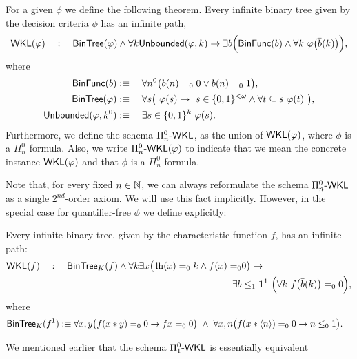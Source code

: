 \begin{dfn} \label{l:WKL-Feferman}
For a given $\phi$ we define the following theorem. 
Every infinite binary tree given by the decision criteria $\phi$
 has an infinite path,
\[
\textsf{\upshape WKL}(\varphi)\quad:\quad  \textsf{\upshape BinTree}(\varphi) \wedge \forall k \textsf{\upshape Unbounded}(\varphi,k) 
     \rightarrow \exists b\Big(\textsf{\upshape BinFunc}(b)\wedge\forall k\ \varphi\big(\bar{b}(k)\big)\Big)\text{,}
\]where
\begin{align*}
\BFunc(b)&:\equiv\quad \forall n^0\big(b(n)=_00 \vee b(n)=_01\big)\text{,}\\
\BTree(\phi)&:\equiv\quad \forall s \big(\ 
   \phi(s) 
      \rightarrow
 \ s\in\{0,1\}^{<\omega}
   \wedge 
   \forall t\subseteq s\ \phi(t)\ \big)\text{,}\\
\UnBounded(\phi,k^0)&:\equiv\quad 
  \exists s\in\{0,1\}^{k}\ \phi(s)\text{.}
\end{align*}
Furthermore, we define the schema $\Pi_n^0\textsf{\upshape -}\textsf{\upshape WKL}$, as the union of $\textsf{\upshape WKL}(\varphi)$, where
$\phi$ is a $\Pi_n^0$ formula. Also, we write $\Pi_n^0\textsf{\upshape -}\textsf{\upshape WKL}(\varphi)$ to indicate
that we mean the concrete instance $\textsf{\upshape WKL}(\varphi)$ and that $\phi$ is a $\Pi_n^0$ formula.  \\
\end{dfn}
%
%
Note that, for every fixed $n \in \mathbb{N}$, we can always reformulate
the schema $\Pi^0_n\textsf{\upshape -}\textsf{\upshape WKL}$ as a single $2^{nd}$-order axiom. 
We will use this fact implicitly.
However, in the special case for quantifier-free $\phi$ 
we define explicitly:
\begin{dfn} 
\label{l:WKLdelta}
\label{d:WKLdelta}
Every infinite binary tree, given by the characteristic function $f$,
 has an infinite path:
\begin{align*}
\textsf{\upshape WKL}(f)\quad:\quad\textsf{\upshape BinTree}_K(f) \wedge \forall k\exists x \big(\operatorname{lh}(x)=_0k \wedge f(x)=_0&0\big) 
     \rightarrow\\
 \exists b&\leq_1\mathbf1^1\ \Big(\forall k\ f\big(\bar{b}(k)\big)=_00\Big)\text{,}
\end{align*}
where
\begin{align*}
\BTree_K(f^1)&:\equiv 
  \forall x,y \big(f(x*y)=_00\rightarrow fx=_00\big)\ \wedge\ 
  \forall x,n\big(f(x*\langle n\rangle)=_00\rightarrow n\leq_0 1\big)\text{.}
\end{align*}
\end{dfn}
We mentioned earlier that the schema $\Pi^0_1\textsf{\upshape -}\textsf{\upshape WKL}$ is essentially equivalent
